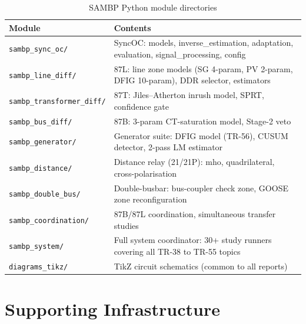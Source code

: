 \documentclass[11pt,a4paper]{article}
\begin{document}
\begin{table}[h!]
\centering
\caption{SAMBP Python module directories}
\begin{tabularx}{\textwidth}{lX}
\toprule
\textbf{Module} & \textbf{Contents} \\
\midrule
\texttt{sambp\_sync\_oc/} & SyncOC: models, inverse\_estimation, adaptation, evaluation, signal\_processing, config \\
\texttt{sambp\_line\_diff/} & 87L: line zone models (SG 4-param, PV 2-param, DFIG 10-param), DDR selector, estimators \\
\texttt{sambp\_transformer\_diff/} & 87T: Jiles--Atherton inrush model, SPRT, confidence gate \\
\texttt{sambp\_bus\_diff/} & 87B: 3-param CT-saturation model, Stage-2 veto \\
\texttt{sambp\_generator/} & Generator suite: DFIG model (TR-56), CUSUM detector, 2-pass LM estimator \\
\texttt{sambp\_distance/} & Distance relay (21/21P): mho, quadrilateral, cross-polarisation \\
\texttt{sambp\_double\_bus/} & Double-busbar: bus-coupler check zone, GOOSE zone reconfiguration \\
\texttt{sambp\_coordination/} & 87B/87L coordination, simultaneous transfer studies \\
\texttt{sambp\_system/} & Full system coordinator: 30+ study runners covering all TR-38 to TR-55 topics \\
\texttt{diagrams\_tikz/} & TikZ circuit schematics (common to all reports) \\
\bottomrule
\end{tabularx}
\end{table}

\section{Supporting Infrastructure}
\end{document}

